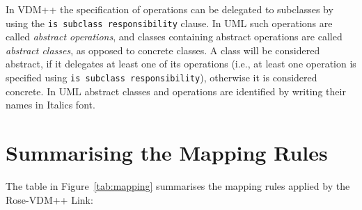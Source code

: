 \documentclass[\pformat,12pt]{article}
\newcommand{\vdmpp}{VDM++}
\newcommand{\link}{Rose-\vdmpp{} Link}
\begin{document}
In \vdmpp{} the specification of operations can be delegated to
subclasses by using the {\tt is subclass responsibility} clause. In
UML such operations are called {\it abstract operations}, and classes
containing abstract operations are called {\it abstract classes}, as
opposed to concrete classes.  A class will be considered abstract, if
it delegates at least one of its operations (i.e., at least one operation is
specified using {\tt is subclass responsibility}), otherwise it is
considered concrete. In UML abstract classes and operations are
identified by writing their names in Italics font.



\newpage
  
  
\newpage
\appendix
\section{Summarising the Mapping Rules}
\label{rules}
The table in Figure~\ref{tab:mapping} summarises the mapping rules applied by the \link{}:  
\end{document}
